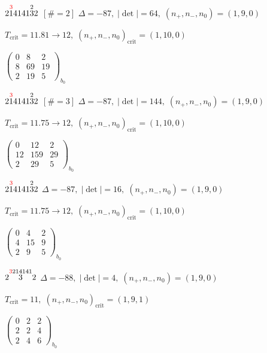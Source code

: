 \documentclass[10pt]{article}
\begin{document}
\smallskip

$2\overset{\textcolor{red}{3}}{1}4141\overset{2}{3}2$ $\scriptstyle [\#=2]$ \quad $\Delta=-87,\; |\det|=64,\; (n_+,n_-,n_0)=(1,9,0)$

\hspace{1em}$T_{\text{crit}}=11.81 \to 12,\; (n_+,n_-,n_0)_{\text{crit}}=(1,10,0)$

\hspace{2em}$\left(\begin{smallmatrix}0 & 8 & 2 \\ 8 & 69 & 19 \\ 2 & 19 & 5\end{smallmatrix}\right)_{\!b_0}$

$2\overset{\textcolor{red}{3}}{1}4141\overset{2}{3}2$ $\scriptstyle [\#=3]$ \quad $\Delta=-87,\; |\det|=144,\; (n_+,n_-,n_0)=(1,9,0)$

\hspace{1em}$T_{\text{crit}}=11.75 \to 12,\; (n_+,n_-,n_0)_{\text{crit}}=(1,10,0)$

\hspace{2em}$\left(\begin{smallmatrix}0 & 12 & 2 \\ 12 & 159 & 29 \\ 2 & 29 & 5\end{smallmatrix}\right)_{\!b_0}$

$2\overset{\textcolor{red}{3}}{1}4141\overset{2}{3}2$ \quad $\Delta=-87,\; |\det|=16,\; (n_+,n_-,n_0)=(1,9,0)$

\hspace{1em}$T_{\text{crit}}=11.75 \to 12,\; (n_+,n_-,n_0)_{\text{crit}}=(1,10,0)$

\hspace{2em}$\left(\begin{smallmatrix}0 & 4 & 2 \\ 4 & 15 & 9 \\ 2 & 9 & 5\end{smallmatrix}\right)_{\!b_0}$

$2\overset{\textcolor{red}{3}214141}{3}2$ \quad $\Delta=-88,\; |\det|=4,\; (n_+,n_-,n_0)=(1,9,0)$

\hspace{1em}$T_{\text{crit}}=11,\; (n_+,n_-,n_0)_{\text{crit}}=(1,9,1)$

\hspace{2em}$\left(\begin{smallmatrix}0 & 2 & 2 \\ 2 & 2 & 4 \\ 2 & 4 & 6\end{smallmatrix}\right)_{\!b_0}$
\end{document}
